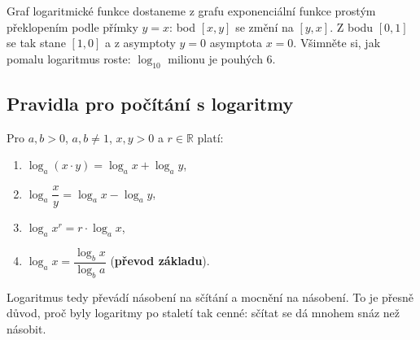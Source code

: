 Graf logaritmické funkce dostaneme z grafu exponenciální funkce prostým překlopením podle přímky $y = x$: bod $[x, y]$ se změní na $[y, x]$. Z bodu $[0, 1]$ se tak stane $[1, 0]$ a z asymptoty $y = 0$ asymptota $x = 0$. Všimněte si, jak pomalu logaritmus roste: $\log_{10}$ milionu je pouhých $6$.

\begin{center}
\end{center}

\subsection{Pravidla pro počítání s logaritmy}\label{sec:pravidla-logaritmy}

\begin{definitionbox}
  Pro $a, b > 0$, $a, b\neq 1$, $x, y > 0$ a $r\in\mathbb{R}$ platí:
  \begin{enumerate}
    \item $\log_a(x\cdot y) = \log_a x + \log_a y$,
    \item $\log_a\dfrac{x}{y} = \log_a x - \log_a y$,
    \item $\log_a x^r = r\cdot\log_a x$,
    \item $\log_a x = \dfrac{\log_b x}{\log_b a}$ \quad(\textbf{převod základu}).
  \end{enumerate}
\end{definitionbox}

Logaritmus tedy převádí násobení na sčítání a mocnění na násobení. To je přesně důvod, proč byly logaritmy po staletí tak cenné: sčítat se dá mnohem snáz než násobit.

